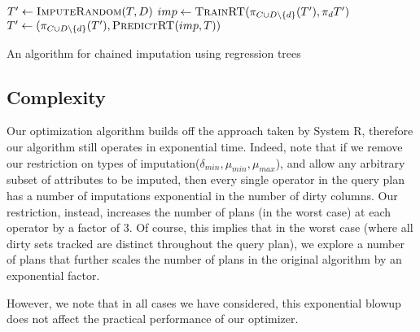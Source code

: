 \begin{algorithm}
  \begin{algorithmic}
    
    	\State $T' \gets \Call{ImputeRandom}{T, D}$
            \State $imp \gets \Call{TrainRT}{\pi_{C \cup D \backslash \{d\}}(T'), \pi_d{T'}}$
            \State $T' \gets (\pi_{C \cup D \backslash \{d\}}(T'), \Call{PredictRT}{imp, T})$
		\EndFor
	\EndFor
	\EndFunction
  \end{algorithmic}
  \caption{An algorithm for chained imputation using regression trees}
  \label{algo:imputation-strategy}
\end{algorithm}


\subsection{Complexity}
Our optimization algorithm builds off the approach taken by System R\cite{blasgen1981system}, therefore our algorithm still operates in exponential time. Indeed, 
note that if we remove our restriction on types of imputation($\delta_{min}, \mu_{min}, \mu_{max}$), and allow any arbitrary subset of attributes to be imputed,
then every single operator in the query plan has a number of imputations exponential in the number of dirty columns. Our restriction, instead, increases the number
of plans (in the worst case) at each operator by a factor of 3. Of course, this implies that in the worst case (where all dirty sets tracked are distinct throughout the query plan),
we explore a number of plans that further scales the number of plans in the original algorithm by an exponential factor.

However, we note that in all cases we have considered, this exponential blowup does not affect the practical performance of our optimizer.

